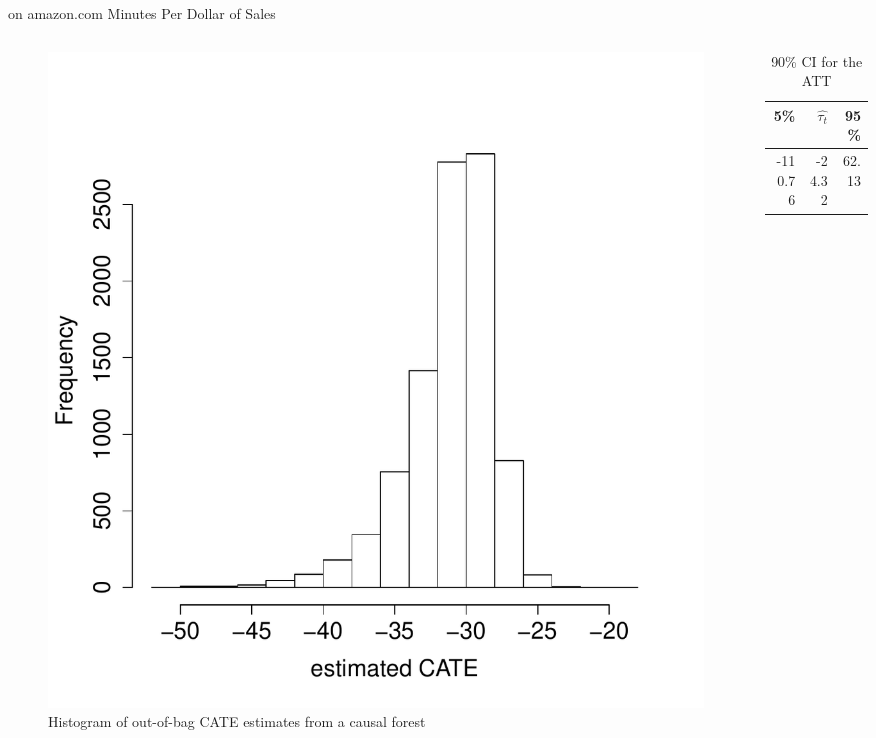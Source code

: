 \documentclass[mathserif, xcolor=table]{beamer}
\begin{document}
\begin{frame}{on amazon.com Minutes Per Dollar of Sales}
\vspace{-1em}
\begin{columns}
\begin{column}{.6\textwidth}
 \begin{figure}[h]
    \centering
    \includegraphics[scale=0.3]{figures/tauhat5_ama_hist.pdf}
    \caption{ Histogram of out-of-bag CATE estimates from a causal forest}
    \label{fig:tauhat5_ama_hist}
\end{figure}
 \end{column}

 \begin{column}{.39\textwidth}
 \begin{table}[h]
 \caption{90\% CI for the ATT} 
\centering
\begin{tabular}{rrr}
  \hline
5\%  & $\hat{\tau_t}$ & 95\% \\ 
  \hline
-110.76 & -24.32 & 62.13 \\ 
   \hline
\end{tabular}
\end{table}
 \end{column}
\end{columns}
\end{frame}
\end{document}
